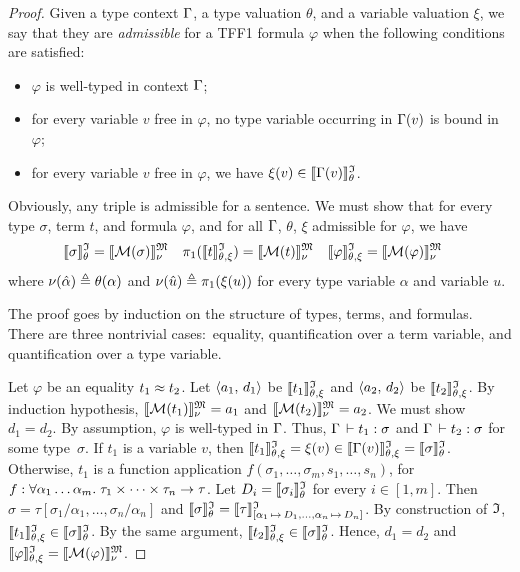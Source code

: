 \begin{proof}
Given a type context $\mathrm{\Gamma}$, a type valuation $\theta$,
and a variable valuation $\xi$, we say that they are \emph{admissible}
for a TFF1 formula $\varphi$ when the following conditions are satisfied:
\begin{itemize}
\item $\varphi$ is well-typed in context $\mathrm{\Gamma}$;
\item for every variable $v$ free in $\varphi$, no type variable
occurring in $\mathrm{\Gamma}(v)$ is bound in $\varphi$;
\item for every variable $v$ free in $\varphi$, we have $\xi(v) \in \llbracket\mathrm{\Gamma}(v)\rrbracket^{\mathfrak{I}}_{\theta}$.
\end{itemize}
Obviously, any triple is admissible for a sentence.
We must show that for every type $\sigma$, term $t$, and formula $\varphi$,
and for all $\mathrm{\Gamma}$, $\theta$, $\xi$ admissible for $\varphi$, we have
\begin{align*}
\llbracket\sigma\rrbracket^{\mathfrak{I}}_{\theta} &= \llbracket \mathcal{M}(\sigma) \rrbracket^{\mathfrak{M}}_{\nu} &
\pi_1(\llbracket t\rrbracket^{\mathfrak{I}}_{\theta,\xi}) &= \llbracket \mathcal{M}(t) \rrbracket^{\mathfrak{M}}_{\nu} &
\llbracket\varphi\rrbracket^{\mathfrak{I}}_{\theta,\xi} &= \llbracket \mathcal{M}(\varphi) \rrbracket^{\mathfrak{M}}_{\nu}
\end{align*}
where $\nu(\hat{\alpha}) \mathrel{\triangleq} \theta(\alpha)$ and
$\nu(\hat{u}) \mathrel{\triangleq} \pi_1(\xi(u))$
for every type variable $\alpha$ and variable $u$.

The proof goes by induction on the structure of types, terms, and formulas.
There are three nontrivial cases:\ equality, quantification over a term
variable, and quantification over a type variable.

Let $\varphi$ be an equality $t_1 \approx t_2$.
Let $\langle a_1,\, d_1 \rangle$ be $\llbracket t_1\rrbracket^{\mathfrak{I}}_{\theta,\xi}$ and $\langle a_2,\, d_2 \rangle$ be $\llbracket t_2\rrbracket^{\mathfrak{I}}_{\theta,\xi}$.
By induction hypothesis, $\llbracket \mathcal{M}(t_1) \rrbracket^{\mathfrak{M}}_{\nu} = a_1$ and
$\llbracket \mathcal{M}(t_2) \rrbracket^{\mathfrak{M}}_{\nu} = a_2$. We must show $d_1 = d_2$.
By assumption, $\varphi$ is well-typed in $\mathrm{\Gamma}$.
Thus, $\mathrm{\Gamma}\,\vdash t_1 \mathrel{:} \sigma$ and $\mathrm{\Gamma}\,\vdash t_2 \mathrel{:} \sigma$
for some type~$\sigma$.
If $t_1$ is a variable $v$, then
$\llbracket t_1\rrbracket^{\mathfrak{I}}_{\theta,\xi} = \xi(v) \in \llbracket\mathrm{\Gamma}(v)\rrbracket^{\mathfrak{I}}_{\theta,\xi} = \llbracket\sigma\rrbracket^{\mathfrak{I}}_{\theta}$. Otherwise,
$t_1$ is a function application $f(\sigma_1,\dots,\sigma_m,s_1,\dots,s_n)$,
for $f \mathrel{:}
\forall \alpha_1\dots\alpha_m .\; \tau_1 \times \dots \times \tau_n \to \tau$.
Let $D_i = \llbracket\sigma_i\rrbracket^{\mathfrak{I}}_{\theta}$ for every $i \in [1,m]$.
Then $\sigma = \tau[\sigma_1/\alpha_1,\dots,\sigma_n/\alpha_n]$ and
$\llbracket\sigma\rrbracket^{\mathfrak{I}}_{\theta} = \llbracket \tau \rrbracket^{\mathfrak{I}}_{[\alpha_1 \,\mapsto\, D_1,\dots,
\alpha_n \,\mapsto\, D_n]}$.
By construction of $\mathfrak{I}$, $\llbracket t_1\rrbracket^{\mathfrak{I}}_{\theta,\xi} \in \llbracket\sigma\rrbracket^{\mathfrak{I}}_{\theta}$.
By the same argument, $\llbracket t_2\rrbracket^{\mathfrak{I}}_{\theta,\xi} \in \llbracket\sigma\rrbracket^{\mathfrak{I}}_{\theta}$.
Hence, $d_1 = d_2$ and $\llbracket\varphi\rrbracket^{\mathfrak{I}}_{\theta,\xi} = \llbracket \mathcal{M}(\varphi) \rrbracket^{\mathfrak{M}}_{\nu}$.


\end{proof}
